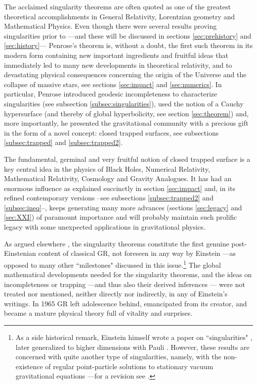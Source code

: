 \documentclass[12pt]{iopart}
\begin{document}
The acclaimed singularity theorems are often quoted as one of the greatest theoretical accomplishments in General Relativity, Lorentzian geometry and Mathematical Physics. Even though there were several results proving singularities prior to \cite{P} ---and these will be discussed in sections \ref{sec:prehistory} and \ref{sec:history}--- Penrose's theorem is, without a doubt, the first such theorem in its modern form containing new important ingredients and fruitful ideas that immediately led to many new developments in theoretical relativity, and to devastating physical consequences concerning the origin of the Universe and the collapse of massive stars, see sections \ref{sec:impact} and \ref{sec:numerics}. In particular, Penrose introduced geodesic incompleteness to characterize singularities (see subsection \ref{subsec:singularities}), used the notion of a Cauchy hypersurface (and thereby of global hyperbolicity, see section \ref{sec:theorem}) and, more importantly, he presented the gravitational community with a precious gift in the form of a novel concept: closed trapped surfaces, see subsections \ref{subsec:trapped} and \ref{subsec:trapped2}.

The fundamental, germinal and very fruitful notion of closed trapped surface is a key central idea in the physics of Black Holes, Numerical Relativity, Mathematical Relativity, Cosmology and Gravity Analogues. It has had an enormous influence as explained succinctly in section \ref{sec:impact} and, in its refined contemporary versions --see subsections \ref{subsec:trapped2} and \ref{subsec:ineq}--, keeps generating many more advances (sections \ref{sec:legacy} and \ref{sec:XXI}) of paramount importance and will probably maintain such prolific legacy with some unexpected applications in gravitational physics.

As argued elsewhere \cite{S5}, the singularity theorems constitute the first genuine post-Einstenian content of classical GR, not foreseen in any way by Einstein ---as opposed to many other ``milestones" discussed in this issue.\footnote{As a side historical remark, Einstein himself wrote a paper on ``singularities" \cite{E}, later generalized to higher dimensions with Pauli \cite{EP}. However, these results are concerned with quite another type of 
singularities, namely, with the non-existence of regular point-particle solutions to stationary vacuum gravitational equations ---for a revision see \cite{GG}.} 
The global mathematical developments needed for the singularity theorems, and the ideas on incompleteness or trapping ---and thus also their 
derived inferences --- were not treated nor mentioned, neither directly nor 
indirectly, in any of Einstein's writings. In 1965 GR left adolescence behind, emancipated from its creator, and became a mature physical theory full of vitality and surprises. 
	
\end{document}
